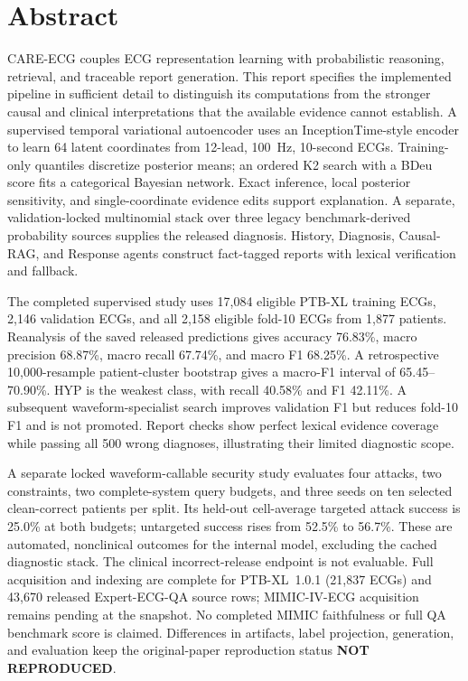\documentclass[11pt,a4paper]{article}
\begin{document}
\section*{Abstract}
CARE-ECG couples ECG representation learning with probabilistic reasoning, retrieval, and traceable report generation. This report specifies the implemented pipeline in sufficient detail to distinguish its computations from the stronger causal and clinical interpretations that the available evidence cannot establish. A supervised temporal variational autoencoder uses an InceptionTime-style encoder to learn 64 latent coordinates from 12-lead, 100~Hz, 10-second ECGs. Training-only quantiles discretize posterior means; an ordered K2 search with a BDeu score fits a categorical Bayesian network. Exact inference, local posterior sensitivity, and single-coordinate evidence edits support explanation. A separate, validation-locked multinomial stack over three legacy benchmark-derived probability sources supplies the released diagnosis. History, Diagnosis, Causal-RAG, and Response agents construct fact-tagged reports with lexical verification and fallback.

The completed supervised study uses 17,084 eligible PTB-XL training ECGs, 2,146 validation ECGs, and all 2,158 eligible fold-10 ECGs from 1,877 patients. Reanalysis of the saved released predictions gives accuracy 76.83\%, macro precision 68.87\%, macro recall 67.74\%, and macro F1 68.25\%. A retrospective 10,000-resample patient-cluster bootstrap gives a macro-F1 interval of 65.45--70.90\%. HYP is the weakest class, with recall 40.58\% and F1 42.11\%. A subsequent waveform-specialist search improves validation F1 but reduces fold-10 F1 and is not promoted. Report checks show perfect lexical evidence coverage while passing all 500 wrong diagnoses, illustrating their limited diagnostic scope.

A separate locked waveform-callable security study evaluates four attacks, two constraints, two complete-system query budgets, and three seeds on ten selected clean-correct patients per split. Its held-out cell-average targeted attack success is 25.0\% at both budgets; untargeted success rises from 52.5\% to 56.7\%. These are automated, nonclinical outcomes for the internal model, excluding the cached diagnostic stack. The clinical incorrect-release endpoint is not evaluable. Full acquisition and indexing are complete for PTB-XL~1.0.1 (21,837 ECGs) and 43,670 released Expert-ECG-QA source rows; MIMIC-IV-ECG acquisition remains pending at the snapshot. No completed MIMIC faithfulness or full QA benchmark score is claimed. Differences in artifacts, label projection, generation, and evaluation keep the original-paper reproduction status \textbf{NOT REPRODUCED}.
\end{document}
